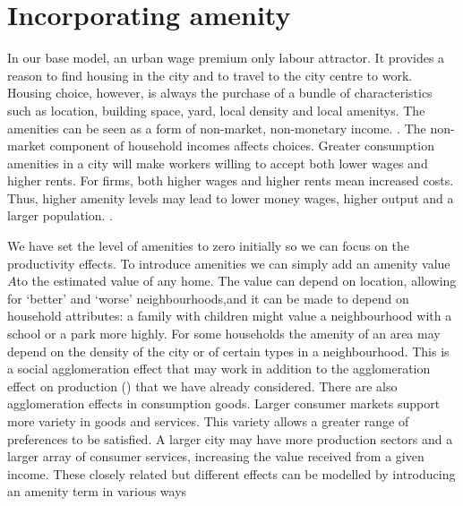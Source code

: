 
\chapter[Amenity]{Incorporating amenity}\label{chapter-amenity}
In our base model,   an urban wage premium only labour attractor. It provides a reason to find housing in the city and to travel to the city centre to work. Housing choice, however, is always the purchase of  a bundle of characteristics such as location, building space, yard, local density and local \glspl{amenity}. The amenities can be seen as a form of non-market, non-monetary income. \cite{kaufmannScalingUrbanAmenities2022}.  The non-market component of household incomes affects choices. Greater consumption amenities in a city will make workers willing to accept both lower wages and higher rents. For firms, both higher wages and higher rents mean increased costs. Thus,  higher amenity levels may lead to lower money wages, higher output and a larger population. \cite{pugaMagnitudeCausesAgglomeration2010}.






We have set the level of amenities to zero initially so we can focus on the productivity effects. To introduce amenities we can simply add  an amenity value $A$to the estimated value of any home. The value can depend on location, allowing for `better' and `worse' neighbourhoods,and it can be made to depend on household attributes: a family with children might value a neighbourhood with a school or a park more highly.  
For some households the amenity of an area may depend on the density of the city or of certain types in a neighbourhood. This is a social agglomeration effect that may work in addition to the agglomeration effect on production (\cite{gurwitzCatastrophicAgglomeration2019}) that we have already considered. There are also agglomeration effects in consumption goods. Larger consumer markets support more variety in goods and services. This variety allows a greater range of preferences to be satisfied. A larger city may have more production sectors and a larger array of consumer services, increasing the value received from a given income.  These closely related but different effects can be modelled by introducing an amenity term in various ways 

